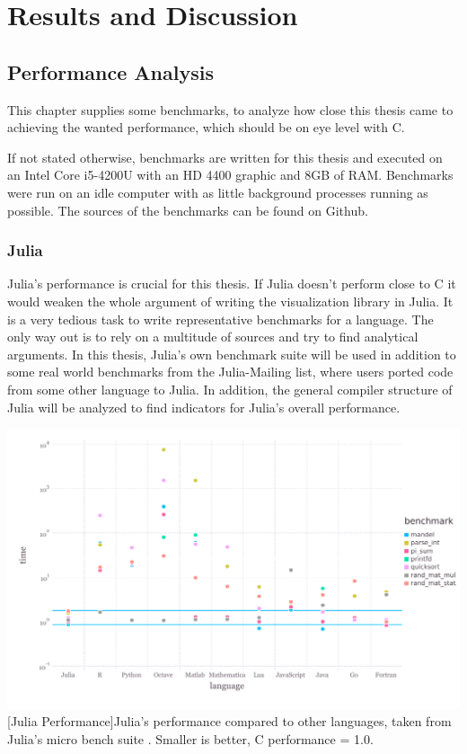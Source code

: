 \section{Results and Discussion}

\subsection{Performance Analysis}
This chapter supplies some benchmarks, to analyze how close this thesis came to achieving the wanted performance, which should be on eye level with C.

If not stated otherwise, benchmarks are written for this thesis and executed on an Intel Core i5-4200U with an HD 4400 graphic and 8GB of RAM.
Benchmarks were run on an idle computer with as little background processes running as possible.
The sources of the benchmarks can be found on Github.

\subsubsection{Julia}

Julia's performance is crucial for this thesis. 
If Julia doesn't perform close to C it would weaken the whole argument of writing the visualization library in Julia.
It is a very tedious task to write representative benchmarks for a language. The only way out is to rely on a multitude of sources and try to find analytical arguments.
In this thesis, Julia's own benchmark suite will be used in addition to some real world benchmarks from the Julia-Mailing list, where users ported code from some other language to Julia.
In addition, the general compiler structure of Julia will be analyzed to find indicators for Julia's overall performance.

\vspace{1em}
\begin{minipage}{\linewidth}
    \centering
    \includegraphics[width=0.9\linewidth]{graphics/juliabench.pdf}
    [Julia Performance]{Julia's performance compared to other languages, taken from Julia's micro bench suite \cite{JuliaBench}. Smaller is better, C performance = 1.0.}
    \label{fig:juliabench}
\end{minipage}

